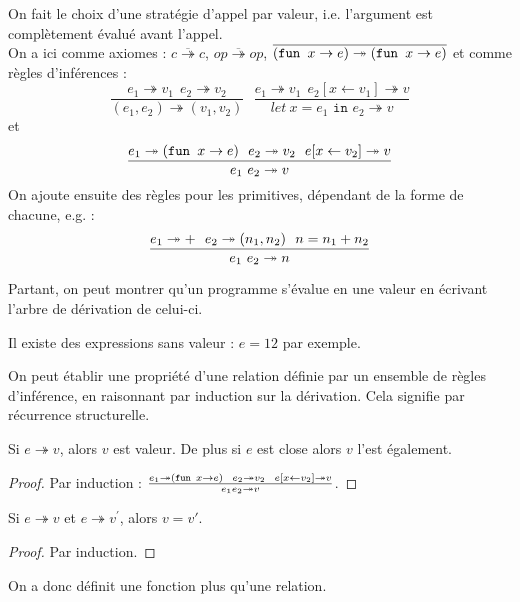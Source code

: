 \documentclass{cours}
\begin{document}
On fait le choix d'une stratégie d'appel par valeur, i.e. l'argument est complètement évalué avant l'appel. \\
On a ici comme axiomes : $\overline{c \twoheadrightarrow c}$, $\overline{op \twoheadrightarrow op}$, $\overline{(\texttt{fun } x \rightarrow e) \twoheadrightarrow (\texttt{fun } x \rightarrow e)}$
et comme règles d'inférences : 
\[    
    \frac{e_{1} \twoheadrightarrow v_{1} \ \ e_{2} \twoheadrightarrow v_{2}}{(e_{1}, e_{2}) \twoheadrightarrow (v_{1}, v_{2})} \ \ \ \frac{e_{1} \twoheadrightarrow v_{1} \ \ e_{2}[x \leftarrow v_{1}] \twoheadrightarrow v}{let\ x  = e_{1} \texttt{ in } e_{2} \twoheadrightarrow v}
\]
et 
\[
  \frac{e_{1}\twoheadrightarrow(\texttt{fun } x \rightarrow e)\ \ e_{2} \twoheadrightarrow v_{2} \ \ e[x \leftarrow v_{2}] \twoheadrightarrow v}{e_{1}\ e_{2} \twoheadrightarrow v}
\]
On ajoute ensuite des règles pour les primitives, dépendant de la forme de chacune, e.g. : 
\[
  \frac{e_{1} \twoheadrightarrow + \ \ e_{2} \twoheadrightarrow (n_{1}, n_{2})\ \ n = n_{1} + n_{2}}{e_{1}\ e_{2} \twoheadrightarrow n}  
\]

Partant, on peut montrer qu'un programme s'évalue en une valeur en écrivant l'arbre de dérivation de celui-ci. \\
\begin{remark}
    Il existe des expressions sans valeur : $e = 1 2$ par exemple.
\end{remark}

On peut établir une propriété d'une relation définie par un ensemble de règles d'inférence, en raisonnant par induction sur la dérivation. Cela signifie par récurrence structurelle.
\begin{proposition}
    Si $e\twoheadrightarrow v$, alors $v$ est valeur. De plus si $e$ est close alors $v$ l'est également.
\end{proposition}
\begin{proof}
    Par induction : $\frac{e_{1} \twoheadrightarrow (\fun{x}{e}) \ \ e_{2} \twoheadrightarrow v_{2} \ \ e[x \leftarrow v_{2}] \twoheadrightarrow v}{e_{1} e_{2} \twoheadrightarrow v}$.
\end{proof}
\begin{proposition}
    Si $e \twoheadrightarrow v$ et $e \twoheadrightarrow v^{'}$, alors $v = v'$.
\end{proposition}
\begin{proof}
    Par induction. 
\end{proof}
\begin{remark}
    On a donc définit une fonction plus qu'une relation. 
\end{remark}
\end{document}
